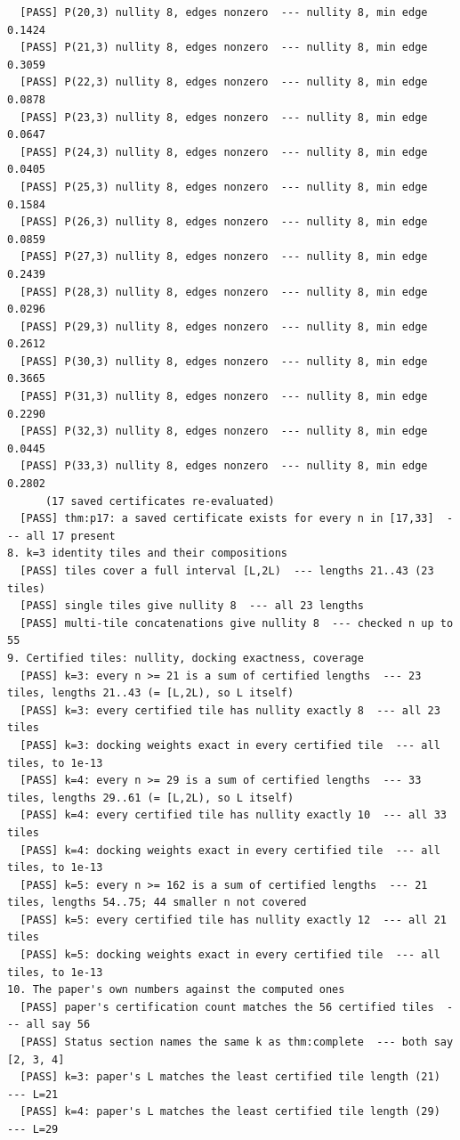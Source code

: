 \documentclass[11pt]{article}
\begin{document}
\begin{verbatim}
  [PASS] P(20,3) nullity 8, edges nonzero  --- nullity 8, min edge 0.1424
  [PASS] P(21,3) nullity 8, edges nonzero  --- nullity 8, min edge 0.3059
  [PASS] P(22,3) nullity 8, edges nonzero  --- nullity 8, min edge 0.0878
  [PASS] P(23,3) nullity 8, edges nonzero  --- nullity 8, min edge 0.0647
  [PASS] P(24,3) nullity 8, edges nonzero  --- nullity 8, min edge 0.0405
  [PASS] P(25,3) nullity 8, edges nonzero  --- nullity 8, min edge 0.1584
  [PASS] P(26,3) nullity 8, edges nonzero  --- nullity 8, min edge 0.0859
  [PASS] P(27,3) nullity 8, edges nonzero  --- nullity 8, min edge 0.2439
  [PASS] P(28,3) nullity 8, edges nonzero  --- nullity 8, min edge 0.0296
  [PASS] P(29,3) nullity 8, edges nonzero  --- nullity 8, min edge 0.2612
  [PASS] P(30,3) nullity 8, edges nonzero  --- nullity 8, min edge 0.3665
  [PASS] P(31,3) nullity 8, edges nonzero  --- nullity 8, min edge 0.2290
  [PASS] P(32,3) nullity 8, edges nonzero  --- nullity 8, min edge 0.0445
  [PASS] P(33,3) nullity 8, edges nonzero  --- nullity 8, min edge 0.2802
      (17 saved certificates re-evaluated)
  [PASS] thm:p17: a saved certificate exists for every n in [17,33]  --- all 17 present
8. k=3 identity tiles and their compositions
  [PASS] tiles cover a full interval [L,2L)  --- lengths 21..43 (23 tiles)
  [PASS] single tiles give nullity 8  --- all 23 lengths
  [PASS] multi-tile concatenations give nullity 8  --- checked n up to 55
9. Certified tiles: nullity, docking exactness, coverage
  [PASS] k=3: every n >= 21 is a sum of certified lengths  --- 23 tiles, lengths 21..43 (= [L,2L), so L itself)
  [PASS] k=3: every certified tile has nullity exactly 8  --- all 23 tiles
  [PASS] k=3: docking weights exact in every certified tile  --- all tiles, to 1e-13
  [PASS] k=4: every n >= 29 is a sum of certified lengths  --- 33 tiles, lengths 29..61 (= [L,2L), so L itself)
  [PASS] k=4: every certified tile has nullity exactly 10  --- all 33 tiles
  [PASS] k=4: docking weights exact in every certified tile  --- all tiles, to 1e-13
  [PASS] k=5: every n >= 162 is a sum of certified lengths  --- 21 tiles, lengths 54..75; 44 smaller n not covered
  [PASS] k=5: every certified tile has nullity exactly 12  --- all 21 tiles
  [PASS] k=5: docking weights exact in every certified tile  --- all tiles, to 1e-13
10. The paper's own numbers against the computed ones
  [PASS] paper's certification count matches the 56 certified tiles  --- all say 56
  [PASS] Status section names the same k as thm:complete  --- both say [2, 3, 4]
  [PASS] k=3: paper's L matches the least certified tile length (21)  --- L=21
  [PASS] k=4: paper's L matches the least certified tile length (29)  --- L=29

\end{verbatim}
\end{document}
